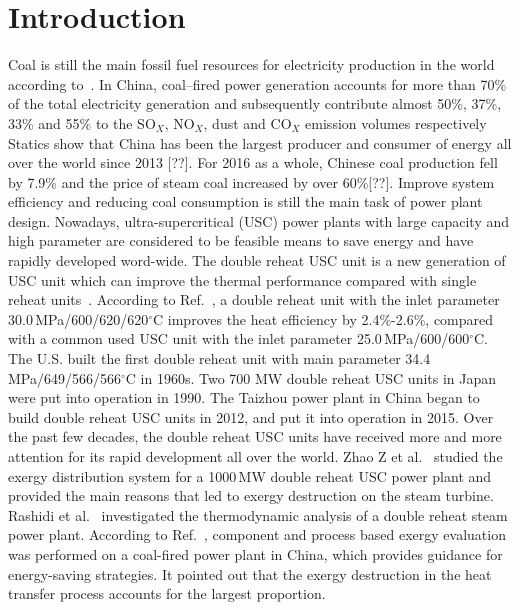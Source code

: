 \documentclass[preprint,12pt]{elsarticle}
\begin{document}
\printnomenclature[1.5cm]{}


\section{Introduction}
\label{sec1:intro}
Coal is still the main fossil fuel resources for electricity production in the world according to~\cite{Ouedraogo2013Energy}. 
In China, coal–fired power generation accounts for more than 70\% of the total electricity generation and subsequently contribute almost 50\%, 37\%, 33\% and 55\% to the SO$_X$, NO$_X$, dust and CO$_X$ emission volumes respectively~\cite{Zhang2010Analysis}
Statics show that China has been the largest producer and consumer of energy all over the world since 2013 [??]. 
For 2016 as a whole, Chinese coal production fell by 7.9\% and the price of steam coal increased by over 60\%[??]. 
Improve system efficiency and reducing coal consumption is still the main task of power plant design. Nowadays, ultra-supercritical (USC) power plants with large capacity and high parameter are considered to be feasible means to save energy and have rapidly developed word-wide.
The double reheat USC unit is a new generation of USC unit which can improve the thermal performance compared with single reheat units~\cite{Zhao2017Exergy}. 
According to Ref.~\cite{Yaxiu2013Thermal}, a double reheat unit with the inlet parameter 30.0\,MPa/600/620/620$^\circ$C improves the heat efficiency by 2.4\%-2.6\%, compared with a common used USC unit with the inlet parameter 25.0\,MPa/600/600$^\circ$C.
 The U.S. built the first double reheat unit with main parameter 34.4 MPa/649/566/566$^\circ$C in 1960s.
 Two 700 MW double reheat USC units in Japan were put into operation in 1990. 
 The Taizhou power plant in China began to build double reheat USC units in 2012, and put it into operation in 2015.
 Over the past few decades, the double reheat USC units have received more and more attention for its rapid development all over the world. Zhao Z et al.~\cite{Zhao2017Exergy} studied the exergy distribution system for a 1000\,MW double reheat USC power plant and provided the main reasons that led to exergy destruction on the steam turbine.
 Rashidi et al.~\cite{Rashidi2014Thermodynamic} investigated the thermodynamic analysis of a double reheat steam power plant.
 According to Ref.~\cite{Wu2014Component}, component and process based exergy evaluation was performed on a coal-fired power plant in China, which provides guidance for energy-saving strategies.
 It pointed out that the exergy destruction in the heat transfer process accounts for the largest proportion.
\end{document}
